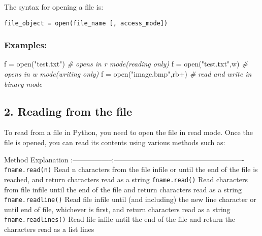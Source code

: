 \documentclass[11pt]{article}
\newenvironment{Shaded}{}{}
\newcommand{\StringTok}[1]{\textcolor[rgb]{0.25,0.44,0.63}{{#1}}}
\newcommand{\CommentTok}[1]{\textcolor[rgb]{0.38,0.63,0.69}{\textit{{#1}}}}
\newcommand{\NormalTok}[1]{{#1}}
\newcommand{\OperatorTok}[1]{\textcolor[rgb]{0.40,0.40,0.40}{{#1}}}
\newcommand{\BuiltInTok}[1]{{#1}}
\begin{document}
The syntax for opening a file is:

\begin{verbatim}
file_object = open(file_name [, access_mode])
\end{verbatim}

\hypertarget{examples}{%
\subsubsection{Examples:}\label{examples}}

\begin{Shaded}
\begin{Highlighting}[]
\NormalTok{f }\OperatorTok{=} \BuiltInTok{open}\NormalTok{(}\StringTok{"test.txt"}\NormalTok{) }\CommentTok{\# opens in r mode(reading only)}
\NormalTok{f }\OperatorTok{=} \BuiltInTok{open}\NormalTok{(}\StringTok{"test.txt"}\NormalTok{,}\StringTok{\textquotesingle{}w\textquotesingle{}}\NormalTok{) }\CommentTok{\# opens in w mode(writing only)}
\NormalTok{f }\OperatorTok{=} \BuiltInTok{open}\NormalTok{(}\StringTok{"image.bmp"}\NormalTok{,}\StringTok{\textquotesingle{}rb+\textquotesingle{}}\NormalTok{) }\CommentTok{\# read and write in binary mode}
\end{Highlighting}
\end{Shaded}

\hypertarget{reading-from-the-uxfb01le}{%
\subsection{2. Reading from the ﬁle}\label{reading-from-the-uxfb01le}}

To read from a file in Python, you need to open the file in read mode.
Once the file is opened, you can read its contents using various methods
such as:

Method \textbar Explanation
:-----------------\textbar:-------------------------------------------------------
\texttt{fname.read(n)} \textbar{} Read n characters from the ﬁle infile
or until the end of the ﬁle is reached, and return characters read as a
string \texttt{fname.read()} \textbar{} Read characters from ﬁle infile
until the end of the ﬁle and return characters read as a string
\texttt{fname.readline()} \textbar{} Read ﬁle infile until (and
including) the new line character or until end of ﬁle, whichever is
ﬁrst, and return characters read as a string
\texttt{fname.readlines()}\textbar{} Read ﬁle infile until the end of
the ﬁle and return the characters read as a list lines
\end{document}
